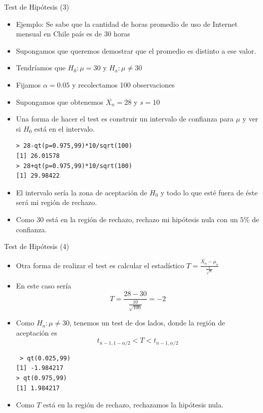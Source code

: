 \documentclass[handout]{beamer}
\begin{document}
\begin{frame}[fragile]{Test de Hipótesis (3)}
\scriptsize{
\begin{itemize}
 \item Ejemplo: Se sabe que la cantidad de horas promedio de uso de Internet mensual en Chile país es de 30 horas
 \item Supongamos que queremos demostrar que el promedio es distinto a ese valor.
 \item Tendríamos que $H_0: \mu=30$ y $H_{a}: \mu \neq 30$
 \item Fijamos $\alpha=0.05$ y recolectamos 100 observaciones
 \item Supongamos que obtenemos $\overline{X_{n}}=28$ y $s=10$
 \item Una forma de hacer el test es construir un intervalo de confianza para $\mu$ y ver si $H_{0}$ está en el intervalo.
\begin{verbatim}
> 28-qt(p=0.975,99)*10/sqrt(100)
[1] 26.01578
> 28+qt(p=0.975,99)*10/sqrt(100)
[1] 29.98422 
\end{verbatim}
\item El intervalo sería la zona de aceptación de $H_0$ y todo lo que esté fuera de éste será mi región de rechazo.
\item Como 30 está en la región de rechazo, rechazo mi hipótesis nula con un $5\%$ de confianza.
\end{itemize}



} 
\end{frame}


\begin{frame}[fragile]{Test de Hipótesis (4)}
\scriptsize{
\begin{itemize}
 \item Otra forma de realizar el test es calcular el estadístico $T=\frac{\overline{X_{n}}-\mu_{o}}{\frac{s}{\sqrt{n}}}$
 \item En este caso sería \begin{displaymath}
                           T=\frac{28-30}{\frac{10}{\sqrt{100}}}=-2
                          \end{displaymath}
\item Como $H_{a}: \mu \neq 30$, tenemos un test de dos lados, donde la región de aceptación es
\begin{displaymath}
 t_{n-1,1-\alpha/2}<T<t_{n-1,\alpha/2}
\end{displaymath}
\begin{verbatim}
 > qt(0.025,99)
[1] -1.984217
> qt(0.975,99)
[1] 1.984217
\end{verbatim}
\item Como $T$ está en la región de rechazo, rechazamos la hipótesis nula.

\end{itemize}



} 
\end{frame}
\end{document}
